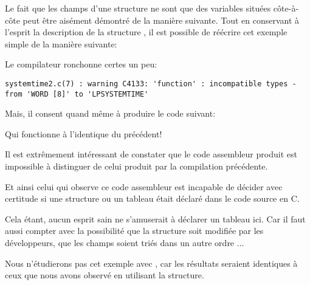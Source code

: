 Le fait que les champs d'une structure ne sont que des variables situées côte-à-côte peut être
aisément démontré de la manière suivante.
Tout en conservant à l'esprit la description de la structure , il est possible de
réécrire cet exemple simple de la manière suivante:



Le compilateur ronchonne certes un peu:

\begin{lstlisting}
systemtime2.c(7) : warning C4133: 'function' : incompatible types - from 'WORD [8]' to 'LPSYSTEMTIME'
\end{lstlisting}

Mais, il consent quand même à produire le code suivant:



Qui fonctionne à l'identique du précédent!

Il est extrêmement intéressant de constater que le code assembleur produit est impossible à
distinguer de celui produit par la compilation précédente.

Et ainsi celui qui observe ce code assembleur est incapable de décider avec certitude si une
structure ou un tableau était déclaré dans le code source en C.

Cela étant, aucun esprit sain ne s'amuserait à déclarer un tableau ici. Car il faut aussi compter
avec la possibilité que la structure soit modifiée par les développeurs, que les champs soient
triés dans un autre ordre ...

Nous n'étudierons pas cet exemple avec \olly, car les résultats seraient identiques à ceux que nous
avons observé en utilisant la structure.


